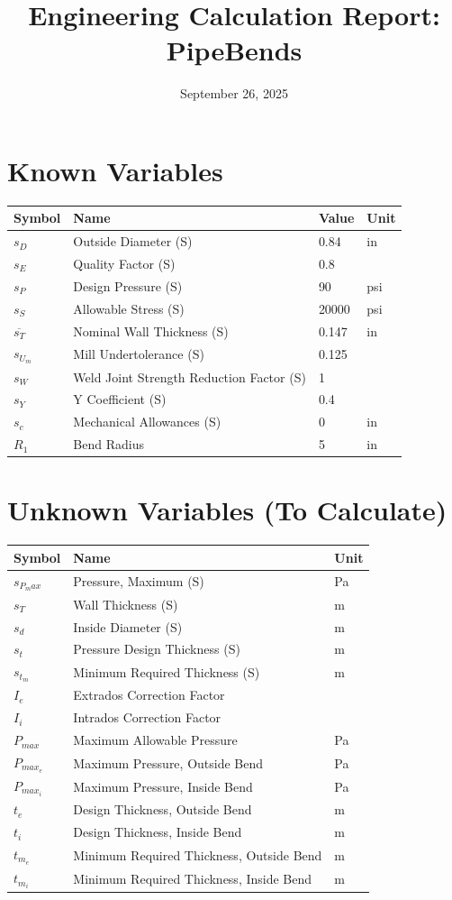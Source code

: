 \documentclass[11pt,a4paper]{article}
\title{Engineering Calculation Report: PipeBends}
\date{September 26, 2025}
\begin{document}
\maketitle

\section{Known Variables}

\begin{longtable}{llll}
\toprule
Symbol & Name & Value & Unit \\
\midrule
\endhead
$s_{D}$ & Outside Diameter (S) & 0.84 & in \\
$s_{E}$ & Quality Factor (S) & 0.8 &  \\
$s_{P}$ & Design Pressure (S) & 90 & psi \\
$s_{S}$ & Allowable Stress (S) & 20000 & psi \\
$\overline{s_T}$ & Nominal Wall Thickness (S) & 0.147 & in \\
$s_{U_m}$ & Mill Undertolerance (S) & 0.125 &  \\
$s_{W}$ & Weld Joint Strength Reduction Factor (S) & 1 &  \\
$s_{Y}$ & Y Coefficient (S) & 0.4 &  \\
$s_{c}$ & Mechanical Allowances (S) & 0 & in \\
$R_{1}$ & Bend Radius & 5 & in \\
\bottomrule
\end{longtable}

\section{Unknown Variables (To Calculate)}

\begin{longtable}{lll}
\toprule
Symbol & Name & Unit \\
\midrule
\endhead
$s_{P_max}$ & Pressure, Maximum (S) & Pa \\
$s_{T}$ & Wall Thickness (S) & m \\
$s_{d}$ & Inside Diameter (S) & m \\
$s_{t}$ & Pressure Design Thickness (S) & m \\
$s_{t_m}$ & Minimum Required Thickness (S) & m \\
$I_{e}$ & Extrados Correction Factor &  \\
$I_{i}$ & Intrados Correction Factor &  \\
$P_{max}$ & Maximum Allowable Pressure & Pa \\
$P_{max_e}$ & Maximum Pressure, Outside Bend & Pa \\
$P_{max_i}$ & Maximum Pressure, Inside Bend & Pa \\
$t_{e}$ & Design Thickness, Outside Bend & m \\
$t_{i}$ & Design Thickness, Inside Bend & m \\
$t_{m_e}$ & Minimum Required Thickness, Outside Bend & m \\
$t_{m_i}$ & Minimum Required Thickness, Inside Bend & m \\
\bottomrule
\end{longtable}
\end{document}
